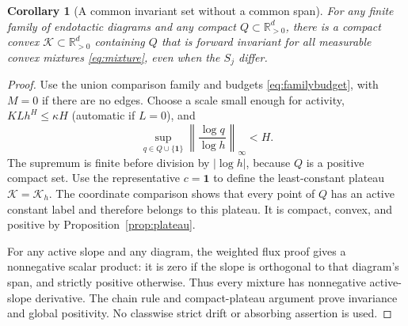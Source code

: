 \documentclass[11pt]{article}
\newtheorem{corollary}[theorem]{Corollary}
\theoremstyle{definition}
\theoremstyle{remark}
\newcommand{\R}{\mathbb R}
\newcommand{\one}{\mathbf 1}
\newcommand{\norm}[1]{\left\|#1\right\|}
\numberwithin{equation}{section}
\begin{document}
\begin{corollary}[A common invariant set without a common span]
\label{cor:safety}
For any finite family of endotactic diagrams and any compact
$Q\subset\R_{>0}^d$, there is a compact convex
$\mathcal K\subset\R_{>0}^d$ containing $Q$ that is forward
invariant for all measurable convex mixtures
\eqref{eq:mixture}, even when the $S_j$ differ.
\end{corollary}
\begin{proof}
Use the union comparison family and budgets
\eqref{eq:familybudget}, with $M=0$ if there are no edges.
Choose a scale small enough for activity,
$KLh^H\leq\kappa H$ (automatic if $L=0$), and
\[
 \sup_{q\in Q\cup\{\one\}}
       \norm{\frac{\log q}{\log h}}_\infty<H.
\]
The supremum is finite before division by $|\log h|$, because
$Q$ is a positive compact set. Use the representative
$c=\one$ to define the least-constant plateau
$\mathcal K=\mathcal K_h$. The coordinate comparison shows
that every point of $Q$ has an active constant label and
therefore belongs to this plateau. It is compact, convex,
and positive by Proposition~\ref{prop:plateau}.

For any active slope and any diagram, the weighted flux
proof gives a nonnegative scalar product: it is zero if the
slope is orthogonal to that diagram's span, and strictly
positive otherwise. Thus every mixture has nonnegative
active-slope derivative. The chain rule and compact-plateau
argument prove invariance and global positivity. No
classwise strict drift or absorbing assertion is used.
\end{proof}
\end{document}
